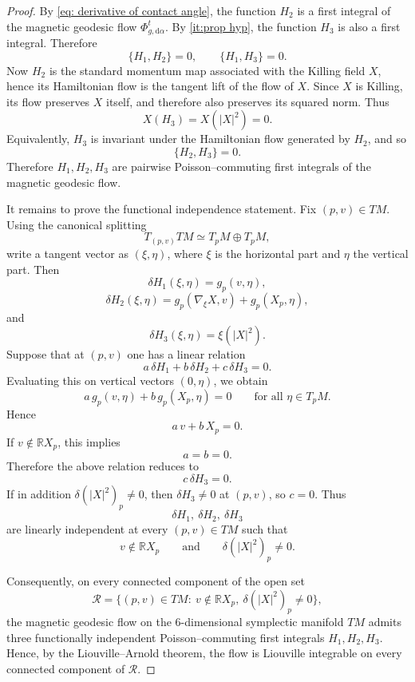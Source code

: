 \documentclass[10pt,a4paper]{amsart}
\def\d{\delta}
\begin{document}
\begin{proof}
By \eqref{eq: derivative of contact angle}, the function \(H_2\) is a first integral of the magnetic geodesic flow \( \varPhi^t_{g,\mathrm d\alpha} \). By \eqref{it:prop hyp}, the function \(H_3\) is also a first integral. Therefore \[ \{H_1,H_2\}=0,\qquad \{H_1,H_3\}=0. \]
Now \(H_2\) is the standard momentum map associated with the Killing field
\(X\), hence its Hamiltonian flow is the tangent lift of the flow of \(X\).
Since \(X\) is Killing, its flow preserves \(X\) itself, and therefore also
preserves its squared norm. Thus
\[
X(H_3)=X(|X|^2)=0.
\]
Equivalently, \(H_3\) is invariant under the Hamiltonian flow generated by
\(H_2\), and so
\[
\{H_2,H_3\}=0.
\]
Therefore \(H_1,H_2,H_3\) are pairwise Poisson--commuting first integrals of
the magnetic geodesic flow.

It remains to prove the functional independence statement. Fix
\((p,v)\in TM\). Using the canonical splitting
\[
T_{(p,v)}TM \simeq T_pM \oplus T_pM,
\]
write a tangent vector as \((\xi,\eta)\), where \(\xi\) is the horizontal part
and \(\eta\) the vertical part. Then
\[
\d H_1(\xi,\eta)=g_p(v,\eta),
\]
\[
\d H_2(\xi,\eta)=g_p(\nabla_\xi X,v)+g_p(X_p,\eta),
\]
and
\[
\d H_3(\xi,\eta)=\xi(|X|^2).
\]
Suppose that at \((p,v)\) one has a linear relation
\[
a\,\d H_1+b\,\d H_2+c\,\d H_3=0 .
\]
Evaluating this on vertical vectors \((0,\eta)\), we obtain
\[
a\,g_p(v,\eta)+b\,g_p(X_p,\eta)=0
\qquad\text{for all }\eta\in T_pM.
\]
Hence
\[
a\,v+b\,X_p=0.
\]
If \(v\notin \mathbb RX_p\), this implies
\[
a=b=0.
\]
Therefore the above relation reduces to
\[
c\,\d H_3=0.
\]
If in addition \(\d(|X|^2)_p\neq 0\), then \(\d H_3\neq 0\) at \((p,v)\), so
\(c=0\). Thus
\[
\d H_1,\ \d H_2,\ \d H_3
\]
are linearly independent at every \((p,v)\in TM\) such that
\[
v\notin \mathbb RX_p
\qquad\text{and}\qquad
\d(|X|^2)_p\neq 0.
\]

Consequently, on every connected component of the open set
\[
\mathcal R
=
\{(p,v)\in TM:\ v\notin \mathbb RX_p,\ \d(|X|^2)_p\neq 0\},
\]
the magnetic geodesic flow on the \(6\)-dimensional symplectic manifold \(TM\)
admits three functionally independent Poisson--commuting first integrals
\(H_1,H_2,H_3\). Hence, by the Liouville--Arnold theorem, the flow is
Liouville integrable on every connected component of \(\mathcal R\).
\end{proof}
\end{document}
